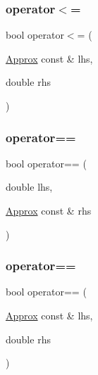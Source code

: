 \subsubsection{\texorpdfstring{operator$<$=}{operator<=}\hspace{0.1cm}{\footnotesize\ttfamily [2/2]}}
{\footnotesize\ttfamily bool operator$<$= (\begin{DoxyParamCaption}\item[{\mbox{\hyperlink{class_catch_1_1_detail_1_1_approx}{Approx}} const \&}]{lhs,  }\item[{double}]{rhs }\end{DoxyParamCaption})\hspace{0.3cm}{\ttfamily [friend]}}

\mbox{\label{class_catch_1_1_detail_1_1_approx_ac766f044f1c63f0c5997982baefd9049}} 
\subsubsection{\texorpdfstring{operator==}{operator==}\hspace{0.1cm}{\footnotesize\ttfamily [1/2]}}
{\footnotesize\ttfamily bool operator== (\begin{DoxyParamCaption}\item[{double}]{lhs,  }\item[{\mbox{\hyperlink{class_catch_1_1_detail_1_1_approx}{Approx}} const \&}]{rhs }\end{DoxyParamCaption})\hspace{0.3cm}{\ttfamily [friend]}}

\mbox{\label{class_catch_1_1_detail_1_1_approx_a35999631e6cef569f9da9f3fa910db22}} 
\subsubsection{\texorpdfstring{operator==}{operator==}\hspace{0.1cm}{\footnotesize\ttfamily [2/2]}}
{\footnotesize\ttfamily bool operator== (\begin{DoxyParamCaption}\item[{\mbox{\hyperlink{class_catch_1_1_detail_1_1_approx}{Approx}} const \&}]{lhs,  }\item[{double}]{rhs }\end{DoxyParamCaption})\hspace{0.3cm}{\ttfamily [friend]}}

